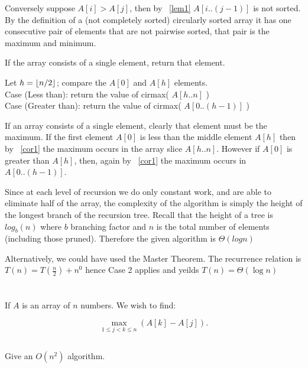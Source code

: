 \documentclass{amsart}
\theoremstyle{definition}
\theoremstyle{remark}
\numberwithin{equation}{section}
\DeclarePairedDelimiter{\floor}{\lfloor}{\rfloor}
\begin{document}
Conversely suppose $A[i] > A[j]$, then by ~\ref{lem1} $A[i..(j-1)]$ is
not sorted. By the definition of a (not completely sorted) circularly
sorted array it has one consecutive pair of elements that are not
pairwise sorted, that pair is the maximum and minimum.


If the array consists of a single element, return that element.

Let $h = \floor{n/2}$; compare the $A[0]$ and $A[h]$ elements. \\

Case (Less than): return the value of cirmax( $A[h..n]$ ) \\

Case (Greater than): return the value of cirmax( $A[0..(h-1)]$ ) \\

\proof

If an array consists of a single element, clearly that element must
be the maximum. If the first element $A[0]$ is less than the middle
element $A[h]$ then by ~\ref{cor1} the maximum occurs in the array slice
$A[h..n]$. However if $A[0]$ is greater than $A[h]$, then, again by
~\ref{cor1} the maximum occurs in $A[0..(h-1)]$.


\proof

Since at each level of recursion we do only constant work, and are able
to eliminate half of the array, the complexity of the algorithm is
simply the height of the longest branch of the recursion tree. Recall
that the height of a tree is $log_{b} (n)$ where $b$ branching factor
and $n$ is the total number of elements (including those pruned).
Therefore the given algorithm is $\Theta( log n )$

Alternatively, we could have used the Master Theorem. The recurrence
relation is $T(n) = T(\frac{n}{2}) + n^0$ hence Case 2 applies and
yeilds $T(n) = \Theta (\log n)$
\\


\section{} If $A$ is an array of $n$ numbers. We wish to find:

$$ \max_{1 \leq j<k \leq n} (A[k] - A[j]).$$

\subsection{} Give an $O( n^2 )$ algorithm.
\end{document}
